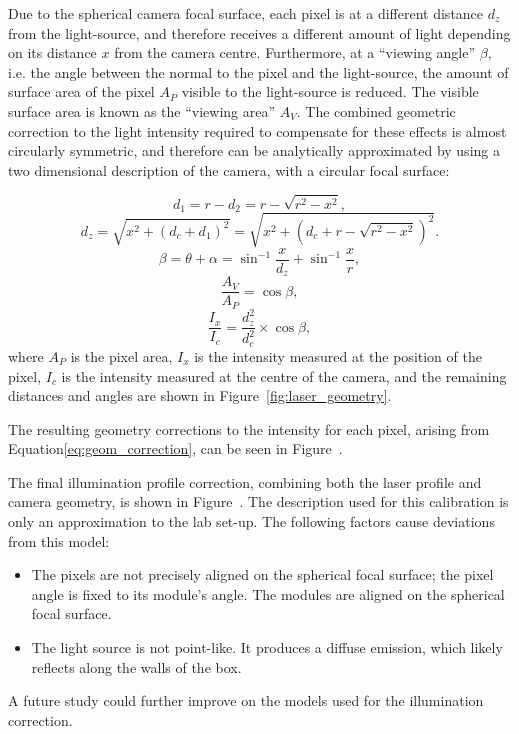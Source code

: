
Due to the spherical camera focal surface, each pixel is at a different distance $d_z$ from the light-source, and therefore receives a different amount of light depending on its distance $x$ from the camera centre. Furthermore, at a ``viewing angle'' $\beta$, i.e. the angle between the normal to the pixel and the light-source, the amount of surface area of the pixel $A_P$ visible to the light-source is reduced. The visible surface area is known as the ``viewing area'' $A_V$. The combined geometric correction to the light intensity required to compensate for these effects is almost circularly symmetric, and therefore can be analytically approximated by using a two dimensional description of the camera, with a circular focal surface:

\begin{equation} \label{eq:geom_distance1}
d_1 = r - d_2 = r - \sqrt{r^2 - x^2},
\end{equation}
\begin{equation} \label{eq:geom_distance2}
d_z = \sqrt{x^2 + (d_c + d_1)^2} = \sqrt{x^2 + (d_c + r - \sqrt{r^2 - x^2})^2}.
\end{equation}
\begin{equation} \label{eq:viewing_area1}
\beta = \theta + \alpha = \sin^{-1}{\frac{x}{d_z}} + \sin^{-1}{\frac{x}{r}},
\end{equation}
\begin{equation} \label{eq:viewing_area2}
\frac{A_V}{A_P} = \cos{\beta},
\end{equation}
\begin{equation} \label{eq:geom_correction}
\frac{I_x}{I_c} = \frac{d_z^2}{d_c^2} \times \cos{\beta},
\end{equation}
where $A_P$ is the pixel area, $I_x$ is the intensity measured at the position of the pixel, $I_c$ is the intensity measured at the centre of the camera, and the remaining distances and angles are shown in Figure~\ref{fig:laser_geometry}.

The resulting geometry corrections to the intensity for each pixel, arising from Equation\ref{eq:geom_correction}, can be seen in Figure~. 

The final illumination profile correction, combining both the laser profile and camera geometry, is shown in Figure~. The description used for this calibration is only an approximation to the lab set-up. The following factors cause deviations from this model:
\begin{itemize}
\item The pixels are not precisely aligned on the spherical focal surface; the pixel angle is fixed to its module's angle. The modules are aligned on the spherical focal surface.
\item The light source is not point-like. It produces a diffuse emission, which likely reflects along the walls of the box.
\end{itemize}
A future study could further improve on the models used for the illumination correction.

